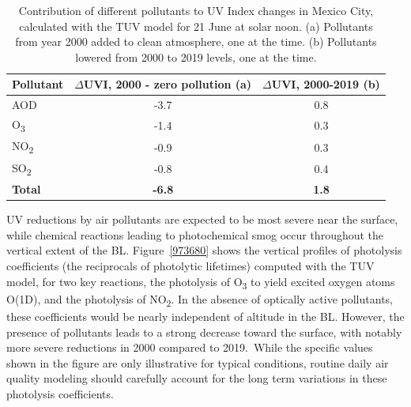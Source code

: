\documentclass[journal=jacsat,manuscript=article]{achemso}
\begin{document}
\begin{table}[H]
  \centering
  \begin{tabular}{lcc}
    \hline
    Pollutant           & $\Delta$UVI, 2000 - zero pollution (a) & $\Delta$UVI, 2000-2019 (b) \\ \hline
    AOD                 & -3.7                                   & 0.8                        \\
    O\textsubscript{3}  & -1.4                                   & 0.3                        \\
    NO\textsubscript{2} & -0.9                                   & 0.3                        \\
    SO\textsubscript{2} & -0.8                                   & 0.4                        \\
    \textbf{Total}      & \textbf{-6.8}                          & \textbf{1.8}               \\\hline
  \end{tabular}
  \caption{Contribution of different pollutants to UV Index changes in Mexico City, calculated with the TUV model for 21 June at solar noon. (a) Pollutants from year 2000 added to clean atmosphere, one at the time. (b) Pollutants lowered from 2000 to 2019 levels, one at the time.}
  \label{table:year2000-2019}
\end{table}

UV reductions by air pollutants are expected to be most severe near the
surface, while chemical reactions leading to photochemical smog occur
throughout the vertical extent of the BL.
Figure~{\ref{973680}} shows the vertical profiles of
photolysis coefficients (the reciprocals of photolytic lifetimes) computed with the TUV model, for
two key reactions, the photolysis of O\textsubscript{3} to yield excited
oxygen atoms O(1D), and the photolysis of NO\textsubscript{2}. In the
absence of optically active pollutants, these coefficients would be
nearly independent of altitude in the BL. However, the presence of
pollutants leads to a strong decrease toward the surface, with notably
more severe reductions in 2000 compared to 2019.~While the specific
values shown in the figure are only illustrative for typical conditions,
routine daily air quality modeling should carefully account for the long
term variations in these photolysis coefficients.
\end{document}
